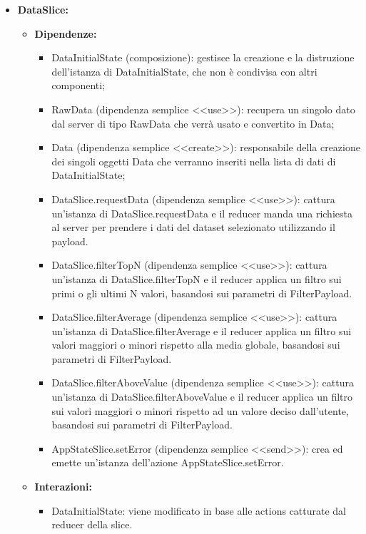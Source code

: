 \begin{itemize}
    \item \textbf{DataSlice:}
    \begin{itemize}
        \item \textbf{Dipendenze:}
        \begin{itemize}
            \item DataInitialState (composizione): gestisce la creazione e la distruzione dell'istanza di DataInitialState, che non è condivisa con altri componenti;
            \item RawData (dipendenza semplice <<use>>): recupera un singolo dato dal server di tipo RawData che verrà usato e convertito in Data;
            \item Data (dipendenza semplice <<create>>): responsabile della creazione dei singoli oggetti Data che verranno inseriti nella lista di dati di DataInitialState;
            \item DataSlice.requestData (dipendenza semplice <<use>>): cattura un'istanza di DataSlice.requestData e il reducer manda una richiesta al server per prendere i dati del dataset selezionato utilizzando il payload.
            \item DataSlice.filterTopN (dipendenza semplice <<use>>): cattura un'istanza di DataSlice.filterTopN e il reducer applica un filtro sui primi o gli ultimi N valori, basandosi sui parametri di FilterPayload.
            \item DataSlice.filterAverage (dipendenza semplice <<use>>): cattura un’istanza di DataSlice.filterAverage e il reducer applica un filtro sui valori maggiori o minori rispetto alla media globale, basandosi sui parametri di FilterPayload.
            \item DataSlice.filterAboveValue (dipendenza semplice <<use>>): cattura un’istanza di DataSlice.filterAboveValue e il reducer applica un filtro sui valori maggiori o minori rispetto ad un valore deciso dall'utente, basandosi sui parametri di FilterPayload.
            \item AppStateSlice.setError (dipendenza semplice <<send>>): crea ed emette un’istanza dell’azione AppStateSlice.setError.
        \end{itemize} 
        \item \textbf{Interazioni:}
        \begin{itemize}
            \item DataInitialState: viene modificato in base alle actions catturate dal reducer della slice.
        \end{itemize} 

\end{itemize}
\end{itemize}
